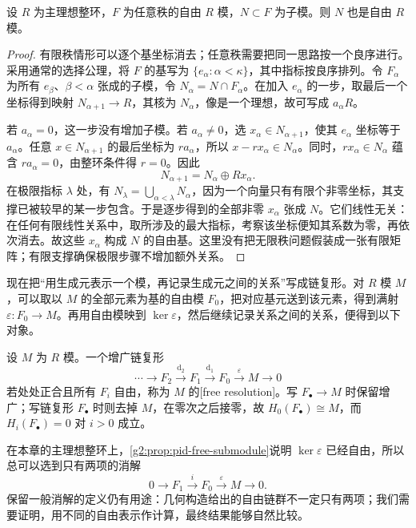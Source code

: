 \begin{proposition}\label{g2:prop:pid-free-submodule}
	设 \(R\) 为主理想整环，\(F\) 为任意秩的自由 \(R\) 模，\(N\subset F\) 为子模。则 \(N\) 也是自由 \(R\) 模。
\end{proposition}
\begin{proof}
	有限秩情形可以逐个基坐标消去；任意秩需要把同一思路按一个良序进行。采用通常的选择公理，将 \(F\) 的基写为 \(\{e_\alpha:\alpha<\kappa\}\)，其中指标按良序排列。令 \(F_\alpha\) 为所有 \(e_\beta\)、\(\beta<\alpha\) 张成的子模，令 \(N_\alpha=N\cap F_\alpha\)。在加入 \(e_\alpha\) 的一步，取最后一个坐标得到映射 \(N_{\alpha+1}\to R\)，其核为 \(N_\alpha\)，像是一个理想，故可写成 \(a_\alpha R\)。

	若 \(a_\alpha=0\)，这一步没有增加子模。若 \(a_\alpha\ne0\)，选 \(x_\alpha\in N_{\alpha+1}\)，使其 \(e_\alpha\) 坐标等于 \(a_\alpha\)。任意 \(x\in N_{\alpha+1}\) 的最后坐标为 \(ra_\alpha\)，所以 \(x-rx_\alpha\in N_\alpha\)。同时，\(rx_\alpha\in N_\alpha\) 蕴含 \(ra_\alpha=0\)，由整环条件得 \(r=0\)。因此
	\[
		N_{\alpha+1}=N_\alpha\oplus Rx_\alpha.
	\]
	在极限指标 \(\lambda\) 处，有 \(N_\lambda=\bigcup_{\alpha<\lambda}N_\alpha\)，因为一个向量只有有限个非零坐标，其支撑已被较早的某一步包含。于是逐步得到的全部非零 \(x_\alpha\) 张成 \(N\)。它们线性无关：在任何有限线性关系中，取所涉及的最大指标，考察该坐标便知其系数为零，再依次消去。故这些 \(x_\alpha\) 构成 \(N\) 的自由基。这里没有把无限秩问题假装成一张有限矩阵；有限支撑确保极限步骤不增加额外关系。
\end{proof}

现在把“用生成元表示一个模，再记录生成元之间的关系”写成链复形。对 \(R\) 模 \(M\)，可以取以 \(M\) 的全部元素为基的自由模 \(F_0\)，把对应基元送到该元素，得到满射 \(\varepsilon:F_0\to M\)。再用自由模映到 \(\ker\varepsilon\)，然后继续记录关系之间的关系，便得到以下对象。

\begin{definition}[自由消解]\label{g2:def:free-resolution}
	设 \(M\) 为 \(R\) 模。一个增广链复形
	\[
		\cdots\longrightarrow F_2\xrightarrow{\mathrm{d}_2}F_1\xrightarrow{\mathrm{d}_1}F_0\xrightarrow{\varepsilon}M\longrightarrow0
	\]
	若处处正合且所有 \(F_i\) 自由，称为 \(M\) 的[free resolution]。写 \(F_\bullet\to M\) 时保留增广；写链复形 \(F_\bullet\) 时则去掉 \(M\)，在零次之后接零，故 \(H_0(F_\bullet)\cong M\)，而 \(H_i(F_\bullet)=0\) 对 \(i>0\) 成立。
\end{definition}

在本章的主理想整环上，\cref{g2:prop:pid-free-submodule}说明 \(\ker\varepsilon\) 已经自由，所以总可以选到只有两项的消解
\begin{equation}\label{g2:eq:two-term-free-resolution}
	0\longrightarrow F_1\xrightarrow{i}F_0\xrightarrow{\varepsilon}M\longrightarrow0.
\end{equation}
保留一般消解的定义仍有用途：几何构造给出的自由链群不一定只有两项；我们需要证明，用不同的自由表示作计算，最终结果能够自然比较。

